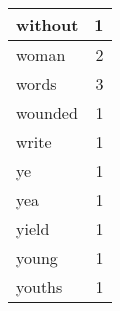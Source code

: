 \begin{center}
\begin{longtable}{l|r}
without & 1\\ \hline 
woman & 2\\ \hline 
words & 3\\ \hline 
wounded & 1\\ \hline 
write & 1\\ \hline 
ye & 1\\ \hline 
yea & 1\\ \hline 
yield & 1\\ \hline 
young & 1\\ \hline 
youths & 1\\ \hline 
\end{longtable}  
\end{center}  


  
\normalsize  

  
  
